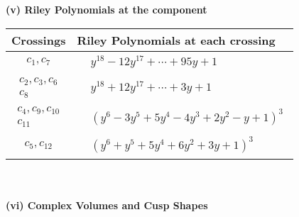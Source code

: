 \documentclass[1p]{elsarticle_modified}
\theoremstyle{definition}
\begin{document}
\newpage\renewcommand{\arraystretch}{1}
\flushleft \textbf{(v) Riley Polynomials at the component}\newline \\
\begin{tabular}{m{50pt}|m{274pt}}
Crossings & \hspace{64pt}Riley Polynomials at each crossing \\
\hline $$\begin{aligned}c_{1},c_{7}\end{aligned}$$&$\begin{aligned}
&y^{18}-12 y^{17}+\cdots+95 y+1
\end{aligned}$\\
\hline $$\begin{aligned}c_{2},c_{3},c_{6}\\c_{8}\end{aligned}$$&$\begin{aligned}
&y^{18}+12 y^{17}+\cdots+3 y+1
\end{aligned}$\\
\hline $$\begin{aligned}c_{4},c_{9},c_{10}\\c_{11}\end{aligned}$$&$\begin{aligned}
&(y^6-3 y^5+5 y^4-4 y^3+2 y^2- y+1)^3
\end{aligned}$\\
\hline $$\begin{aligned}c_{5},c_{12}\end{aligned}$$&$\begin{aligned}
&(y^6+y^5+5 y^4+6 y^2+3 y+1)^3
\end{aligned}$\\
\hline
\end{tabular}\\~\\
\newpage\flushleft \textbf{(vi) Complex Volumes and Cusp Shapes}
\end{document}
